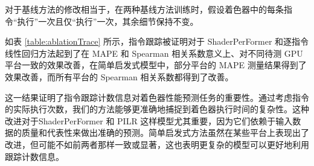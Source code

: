 对于基线方法的修改相当于，在两种基线方法训练时，假设着色器中的每条指令“执行”一次且仅“执行”一次，其余细节保持不变。

如表 \ref{table:ablationTrace} 所示，指令跟踪被证明对于 ShaderPerFormer 和逐指令线性回归方法起到了在 MAPE 和 Spearman 相关系数意义上、对不同待测 GPU 平台一致的效果改善，在简单启发式模型中，部分平台的 MAPE 测量结果得到了效果改善，而所有平台的 Spearman 相关系数都得到了改善。

这一结果证明了指令跟踪计数信息对着色器性能预测任务的重要性。通过考虑指令的实际执行次数，我们的方法能够更准确地捕捉到着色器执行时间的复杂性。这种改进对于ShaderPerFormer 和 PILR 这样模型尤其重要，因为它们依赖于输入数据的质量和代表性来做出准确的预测。简单启发式方法虽然在某些平台上表现出了改进，但可能不如前两者那样一致或显著，这也表明更复杂的模型可以更好地利用跟踪计数信息。

